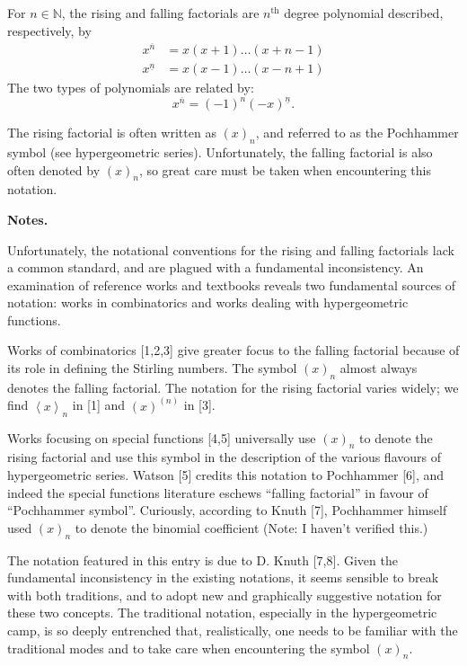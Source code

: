 \documentclass[12pt]{article}
\newcommand{\natnums}{\mathbb{N}}
\newcommand{\supth}{^{\text{th}}}
\newcommand{\on}{{\overline{n}}}
\newcommand{\un}{{\underline{n}}}
\begin{document}
For $n\in\natnums$, the rising and falling factorials are $n\supth$
degree polynomial described, respectively, by
\begin{align*}
x^\on &= x(x+1)\ldots (x+n-1) \\
x^\un &= x(x-1)\ldots (x-n+1)
\end{align*}
The two types of polynomials are related by:
$$x^\on = (-1)^n (-x)^\un.$$


The rising factorial is often written as $(x)_n$, and referred to as
the Pochhammer symbol (see hypergeometric series). Unfortunately, the
falling factorial is also often denoted by $(x)_n$, so great care must
be taken when encountering this notation.


{\bf Notes.}  

Unfortunately, the notational conventions for the rising and falling
factorials lack a common standard, and are plagued with a fundamental
inconsistency. An examination of reference works and textbooks reveals
two fundamental sources of notation: works in combinatorics and works
dealing with hypergeometric functions.

Works of combinatorics [1,2,3] give greater focus to the falling
factorial because of its role in defining the Stirling numbers.
The symbol $(x)_n$ almost always denotes the falling factorial.  The
notation for the rising factorial varies widely; we find
$\left<x\right>_n$ in [1] and $(x)^{(n)}$ in [3].

Works focusing on special functions [4,5]  universally use $(x)_n$ to
denote the rising factorial and use this symbol in the description of
the various flavours of hypergeometric series.  Watson [5] credits
this notation to Pochhammer [6], and indeed the special functions
literature eschews ``falling factorial'' in favour of ``Pochhammer
symbol''.  Curiously, according to Knuth [7], Pochhammer himself used
$(x)_n$ to denote the binomial coefficient (Note: I haven't verified
this.)
 
The notation featured in this entry is due to D. Knuth [7,8].  Given
the fundamental inconsistency in the existing notations, it seems
sensible to break with both traditions, and to adopt new and
graphically suggestive notation for these two concepts.  The
traditional notation, especially in the hypergeometric camp, is so
deeply entrenched that, realistically, one needs to be familiar with
the traditional modes and to take care when encountering the symbol
$(x)_n$.
\end{document}

